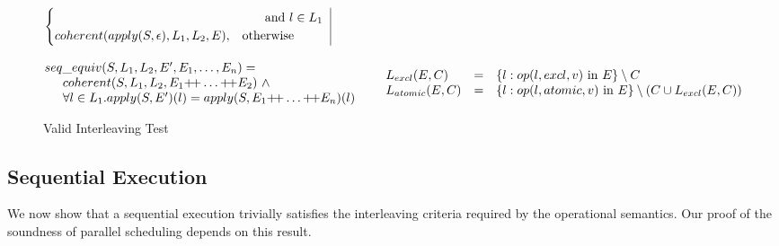 \begin{figure*}
$$\begin{array}{@{}l@{}}
\begin{array}{@{}lll@{}}
{\begin{array}{@{}l|l@{}}
\begin{array}{@{}l@{}}
\begin{cases}
& \hspace{0.25in} \text{and $l \in L_1$} \\
coherent(apply(S, \epsilon), L_1, L_2, E), & \text{otherwise}
\end{cases} 
\end{array}
\end{array}
} \\
\\
\end{array} \\
\begin{array}{@{}ll@{}}
\begin{array}{@{}l@{}}
seq\_equiv(S, L_1, L_2, E', \oton{E}) = \\
\hspace{0.2in} coherent(S, L_1, L_2, E_1 \dplus \ldots \dplus E_2)\ \wedge \\
\hspace{0.2in} \forall l \in L_1. apply(S, E')(l) = apply(S, E_1 \dplus \ldots \dplus E_n)(l)
\end{array} &
\begin{array}{@{\hspace{0.2in}}lll@{}}
L_{excl}(E, C) & = & \{ l : op(l, excl, v) \text{ in } E  \} \setminus C \\
L_{atomic}(E, C) & = & \{ l : op(l, atomic, v) \text{ in } E \} \setminus (C \cup L_{excl}(E, C)) \\
\end{array}
\end{array}
\end{array}
$$
\caption{Valid Interleaving Test}
\label{fig:validinterleave}
\vspace{-5mm}
\end{figure*}

\subsection{Sequential Execution}
\label{subsec:coherenceseq}

We now show that a sequential execution trivially
satisfies the interleaving criteria required by the operational semantics.  Our proof
of the soundness of parallel scheduling depends on this result.

